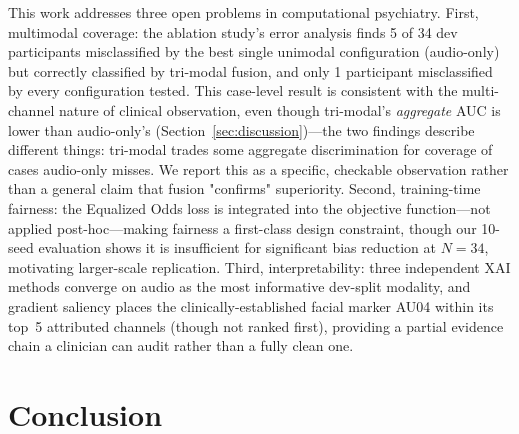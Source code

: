 \documentclass[journal]{IEEEtran}
\begin{document}
This work addresses three open problems in computational psychiatry.
First, multimodal coverage: the ablation study's error analysis finds
5 of 34 dev participants misclassified by the best single unimodal
configuration (audio-only) but correctly classified by tri-modal
fusion, and only 1 participant misclassified by every configuration
tested. This case-level result is consistent with the multi-channel
nature of clinical observation, even though tri-modal's \emph{aggregate}
AUC is lower than audio-only's (Section~\ref{sec:discussion})---the two
findings describe different things: tri-modal trades some aggregate
discrimination for coverage of cases audio-only misses. We report
this as a specific, checkable observation rather than a general claim
that fusion "confirms" superiority. Second, training-time fairness: the
Equalized Odds loss is integrated into the objective function---not
applied post-hoc---making fairness a first-class design constraint,
though our 10-seed evaluation shows it is insufficient for significant
bias reduction at $N{=}34$, motivating larger-scale replication.
Third, interpretability: three independent XAI methods converge on
audio as the most informative dev-split modality, and gradient
saliency places the clinically-established facial marker AU04 within
its top~5 attributed channels (though not ranked first), providing a
partial evidence chain a clinician can audit rather than a fully
clean one.

\section{Conclusion}
\label{sec:conclusion}
\end{document}
